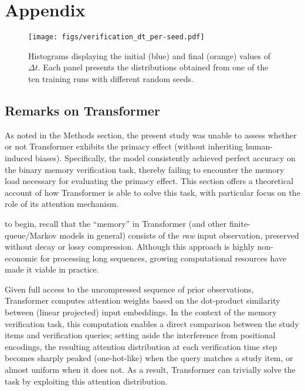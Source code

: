 \documentclass[10pt,letterpaper]{article}
\begin{document}
\section{Appendix}

\begin{figure*}
	\centering
	\texttt{[image: figs/verification\_dt\_per-seed.pdf]}
	\caption{Histograms displaying the initial (blue) and final (orange) values of $\Delta t$. Each panel presents the distributions obtained from one of the ten training runs with different random seeds.}
	\label{fig:delta-t_per-seed}
\end{figure*}

\subsection{Remarks on Transformer}
\label{sec:transformer}

As noted in the Methods section, the present study was unable to assess whether or not Transformer exhibits the primacy effect (without inheriting human-induced biases).
Specifically, the model consistently achieved perfect accuracy on the binary memory verification task, thereby failing to encounter the memory load necessary for evaluating the primacy effect.
This section offers a theoretical account of how Transformer is able to solve this task, with particular focus on the role of its attention mechanism.


to begin, recall that the ``memory'' in Transformer (and other finite-queue/Markov models in general) consists of the \emph{raw} input observation, preserved without decay or lossy compression.
Although this approach is highly non-economic for processing long sequences, growing computational resources have made it viable in practice.

Given full access to the uncompressed sequence of prior observations, Transformer computes attention weights based on the dot-product similarity between (linear projected) input embeddings.
In the context of the memory verification task, this computation enables a direct comparison between the study items and verification queries;
setting aside the interference from positional encodings, the resulting attention distribution at each verification time step becomes sharply peaked (one-hot-like) when the query matches a study item, or almost uniform when it does not.
As a result, Transformer can trivially solve the task by exploiting this attention distribution.
\end{document}
